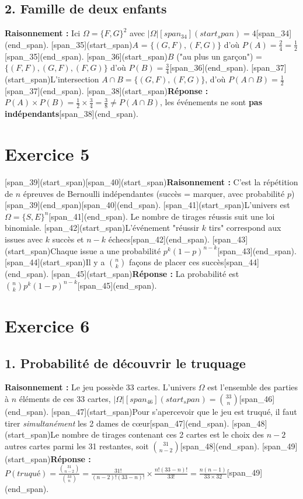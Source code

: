 \documentclass[11pt,a4paper]{article}
\begin{document}
\subsection*{2. Famille de deux enfants}
\textbf{Raisonnement :} Ici $\Omega = \{F, G\}^2$ avec $|\Omega| [span_34](start_span)= 4$[span_34](end_span).
[span_35](start_span)$A$ = $\{(G,F), (F,G)\}$ d'où $P(A) = \frac{2}{4} = \frac{1}{2}$[span_35](end_span).
[span_36](start_span)$B$ ("au plus un garçon") = $\{(F,F), (G,F), (F,G)\}$ d'où $P(B) = \frac{3}{4}$[span_36](end_span).
[span_37](start_span)L'intersection $A \cap B = \{(G,F), (F,G)\}$, d'où $P(A \cap B) = \frac{1}{2}$[span_37](end_span).
[span_38](start_span)\textbf{Réponse :} $P(A) \times P(B) = \frac{1}{2} \times \frac{3}{4} = \frac{3}{8} \neq P(A \cap B)$, les événements ne sont \textbf{pas indépendants}[span_38](end_span).

\hrulefill

\section*{Exercice 5}
[span_39](start_span)[span_40](start_span)\textbf{Raisonnement :} C'est la répétition de $n$ épreuves de Bernoulli indépendantes (succès = marquer, avec probabilité $p$)[span_39](end_span)[span_40](end_span). [span_41](start_span)L'univers est $\Omega = \{S, E\}^n$[span_41](end_span).
Le nombre de tirages réussis suit une loi binomiale. [span_42](start_span)L'événement "réussir $k$ tirs" correspond aux issues avec $k$ succès et $n-k$ échecs[span_42](end_span). [span_43](start_span)Chaque issue a une probabilité $p^k(1-p)^{n-k}$[span_43](end_span). [span_44](start_span)Il y a $\binom{n}{k}$ façons de placer ces succès[span_44](end_span).
[span_45](start_span)\textbf{Réponse :} La probabilité est $\binom{n}{k}p^k(1-p)^{n-k}$[span_45](end_span).

\hrulefill

\section*{Exercice 6}

\subsection*{1. Probabilité de découvrir le truquage}
\textbf{Raisonnement :} Le jeu possède 33 cartes. L'univers $\Omega$ est l'ensemble des parties à $n$ éléments de ces 33 cartes, $|\Omega| [span_46](start_span)= \binom{33}{n}$[span_46](end_span).
[span_47](start_span)Pour s'apercevoir que le jeu est truqué, il faut tirer \textit{simultanément} les 2 dames de cœur[span_47](end_span). [span_48](start_span)Le nombre de tirages contenant ces 2 cartes est le choix des $n-2$ autres cartes parmi les 31 restantes, soit $\binom{31}{n-2}$[span_48](end_span).
[span_49](start_span)\textbf{Réponse :} $P(truqué) = \frac{\binom{31}{n-2}}{\binom{33}{n}} = \frac{31!}{(n-2)!(33-n)!} \times \frac{n!(33-n)!}{33!} = \frac{n(n-1)}{33 \times 32}$[span_49](end_span).
\end{document}
